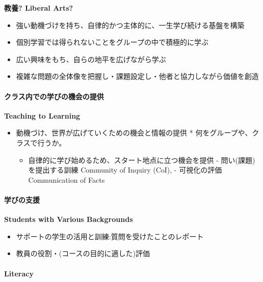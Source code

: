 \documentclass[
]{bxjsbook}
\providecommand{\tightlist}{%
  \setlength{\itemsep}{0pt}\setlength{\parskip}{0pt}}
\theoremstyle{definition}
\theoremstyle{definition}
\theoremstyle{definition}
\theoremstyle{definition}
\theoremstyle{remark}
\begin{document}
\textbf{教養? Liberal Arts?}

\begin{itemize}
\tightlist
\item
  強い動機づけを持ち、自律的かつ主体的に、一生学び続ける基盤を構築
\item
  個別学習では得られないことをグループの中で積極的に学ぶ
\item
  広い興味をもち、自らの地平を広げながら学ぶ
\item
  複雑な問題の全体像を把握し・課題設定し・他者と協力しながら価値を創造
\end{itemize}

\hypertarget{ux30afux30e9ux30b9ux5185ux3067ux306eux5b66ux3073ux306eux6a5fux4f1aux306eux63d0ux4f9b}{%
\paragraph{クラス内での学びの機会の提供}\label{ux30afux30e9ux30b9ux5185ux3067ux306eux5b66ux3073ux306eux6a5fux4f1aux306eux63d0ux4f9b}}

\textbf{Teaching to Learning}

\begin{itemize}
\tightlist
\item
  動機づけ、世界が広げていくための機会と情報の提供 * 何をグループや、クラスで行うか。

  \begin{itemize}
  \tightlist
  \item
    自律的に学び始めるため、スタート地点に立つ機会を提供 - 問い(課題)を提出する訓練 Community of Inquiry (CoI), - 可視化の評価 Communication of Facts
  \end{itemize}
\end{itemize}

\hypertarget{ux5b66ux3073ux306eux652fux63f4}{%
\paragraph{学びの支援}\label{ux5b66ux3073ux306eux652fux63f4}}

\textbf{Students with Various Backgrounds}

\begin{itemize}
\tightlist
\item
  サポートの学生の活用と訓練:質問を受けたことのレポート
\item
  教員の役割・(コースの目的に適した)評価
\end{itemize}

\hypertarget{literacy}{%
\paragraph{Literacy}\label{literacy}}
\end{document}
